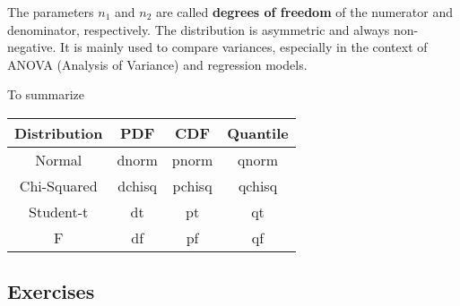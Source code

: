 The parameters $n_1$ and $n_2$ are called \textbf{degrees of freedom} of the numerator and denominator, respectively.  
The distribution is asymmetric and always non-negative.  
It is mainly used to compare variances, especially in the context of ANOVA (Analysis of Variance) and regression models.


\vspace{10pt}

To summarize

\begin{table}[h]
    \centering
    \begin{tabular}{|c|c|c|c|} %
        \hline %
        \textbf{Distribution} & \textbf{PDF}  & \textbf{CDF}  & \textbf{Quantile} \\
        \hline %
        Normal & dnorm & pnorm & qnorm \\
        \hline
        Chi-Squared & dchisq & pchisq & qchisq \\
        \hline
        Student-t & dt & pt & qt \\
        \hline
        F & df & pf & qf \\
        \hline %
    \end{tabular}
    \label{tab:distributions}
\end{table}





























\subsection{Exercises}  

